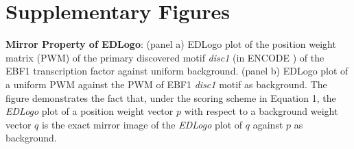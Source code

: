 \documentclass[10pt,letterpaper]{article}
\begin{document}
\section*{Supplementary Figures}
\newpage

\textbf{Mirror Property of EDLogo}: (panel a) EDLogo plot of the  position weight matrix (PWM) of the primary discovered motif \textit{disc1} (in ENCODE \cite{Kheradpour2013}) of the EBF1 transcription factor against uniform background. (panel b) EDLogo plot of a uniform PWM against the PWM of  EBF1 \textit{disc1} motif as background. The figure demonstrates the fact that, under the scoring scheme in Equation 1, the \textit{EDLogo} plot of a position weight vector $p$ with respect to a background weight vector $q$ is the exact mirror image of the \textit{EDLogo} plot of $q$ against $p$ as background.

      

\end{document}
